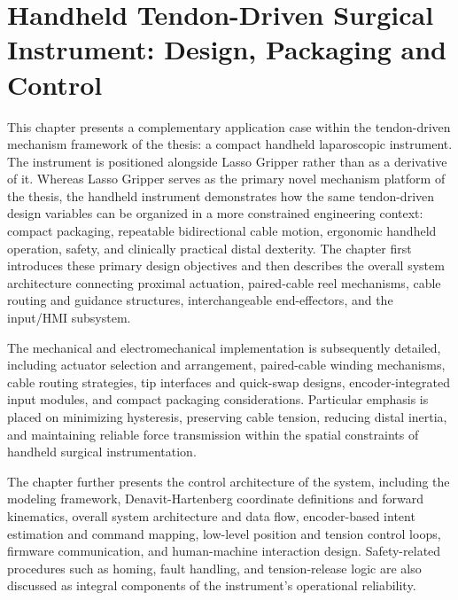﻿%
\chapter{Handheld Tendon-Driven Surgical Instrument: Design, Packaging and Control}

\label{Chapter7}

\begin{chaptersummary}
This chapter presents a complementary application case within the tendon-driven mechanism framework of the thesis: a compact handheld laparoscopic instrument. The instrument is positioned alongside Lasso Gripper rather than as a derivative of it. Whereas Lasso Gripper serves as the primary novel mechanism platform of the thesis, the handheld instrument demonstrates how the same tendon-driven design variables can be organized in a more constrained engineering context: compact packaging, repeatable bidirectional cable motion, ergonomic handheld operation, safety, and clinically practical distal dexterity. The chapter first introduces these primary design objectives and then describes the overall system architecture connecting proximal actuation, paired-cable reel mechanisms, cable routing and guidance structures, interchangeable end-effectors, and the input/HMI subsystem.

The mechanical and electromechanical implementation is subsequently detailed, including actuator selection and arrangement, paired-cable winding mechanisms, cable routing strategies, tip interfaces and quick-swap designs, encoder-integrated input modules, and compact packaging considerations. Particular emphasis is placed on minimizing hysteresis, preserving cable tension, reducing distal inertia, and maintaining reliable force transmission within the spatial constraints of handheld surgical instrumentation.

The chapter further presents the control architecture of the system, including the modeling framework, Denavit-Hartenberg coordinate definitions and forward kinematics, overall system architecture and data flow, encoder-based intent estimation and command mapping, low-level position and tension control loops, firmware communication, and human-machine interaction design. Safety-related procedures such as homing, fault handling, and tension-release logic are also discussed as integral components of the instrument's operational reliability.
\end{chaptersummary}

